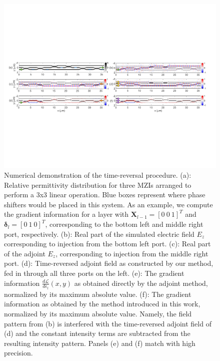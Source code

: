 \begin{figure}[t]
\includegraphics[width=\textwidth]{figures/insitu_FDFD}
\caption{\label{fig:fdfd} Numerical demonstration of the time-reversal procedure.  (a): Relative permittivity distribution for three MZIs arranged to perform a 3x3 linear operation. Blue boxes represent where phase shifters would be placed in this system. As an example, we compute the gradient information for a layer with $\mathbf{X}_{l-1} = [0~0~1]^T$ and $\boldsymbol{\delta}_l = [0~1~0]^T$, corresponding to the bottom left and middle right port, respectively. (b): Real part of the simulated electric field $E_z$ corresponding to injection from the bottom left port. (c): Real part of the adjoint $E_z$, corresponding to injection from the middle right port. (d): Time-reversed adjoint field as constructed by our method, fed in through all three ports on the left. (e): The gradient information $\frac{d\mathcal{L}}{d\epsilon_l}(x,y)$ as obtained directly by the adjoint method, normalized by its maximum absolute value. (f): The gradient information as obtained by the method introduced in this work, normalized by its maximum absolute value. Namely, the field pattern from (b) is interfered with the time-reversed adjoint field of (d) and the constant intensity terms are subtracted from the resulting intensity pattern. Panels (e) and (f) match with high precision.}
\end{figure}

